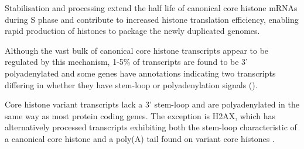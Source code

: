   \begin{figure}
    \centering
    \hfill
  \end{figure}

  Stabilisation and processing extend the half life of canonical core histone \mbox{mRNAs}
  during S phase and contribute to increased histone translation efficiency,
  enabling rapid production of histones to package the newly duplicated genomes.

  Although the vast bulk of canonical core histone transcripts
  appear to be regulated by this mechanism,
  1-5\% of transcripts are found to be 3' polyadenylated \citep{YangGenomeBiol2011}
  and some genes have annotations indicating two transcripts
  differing in whether they have stem-loop or polyadenylation signals ().

  Core histone variant transcripts lack a 3' stem-loop and are
  polyadenylated in the same way as most protein coding genes.
  The exception is H2AX, which has alternatively processed transcripts
  exhibiting both the stem-loop characteristic of a canonical core histone
  and a poly(A) tail found on variant core histones \citep{HTwoAX-transcripts,our-H2AX-review}.
